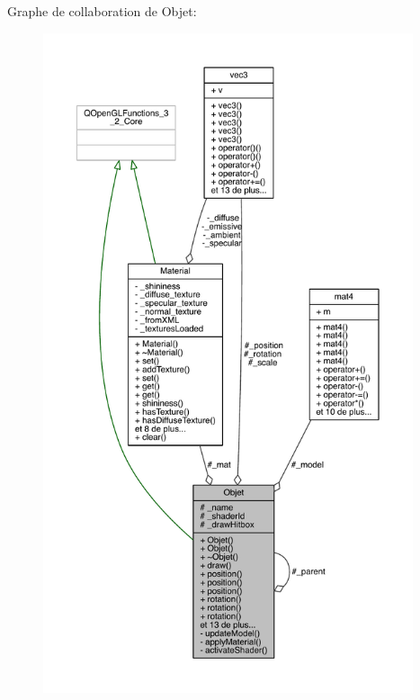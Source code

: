 Graphe de collaboration de Objet\+:
\nopagebreak
\begin{figure}[H]
\begin{center}
\leavevmode
\includegraphics[height=550pt]{class_objet__coll__graph}
\end{center}
\end{figure}
